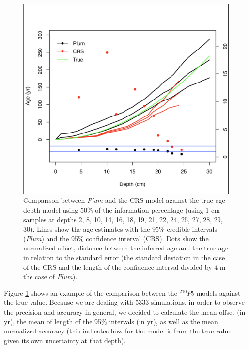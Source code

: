 \documentclass [10pt] {article}
\begin{document}
\begin{figure}[!]
	\begin{centering}
		\includegraphics[width=\linewidth]{comparison1.png}
		\caption{Comparison between \textit{Plum} and the CRS model against the true age-depth model using 50\% of the information percentage (using 1-cm samples at depths 2, 8, 10, 14, 16, 18, 19, 21, 22, 24, 25, 27, 28, 29, 30). Lines show the age estimates with the 95\% credible intervals (\textit{Plum}) and the 95\% confidence interval (CRS). Dots show the normalized offset, distance between the inferred age and the true age in relation to the standard error (the standard deviation in the case of the CRS and the length of the confidence interval divided by 4 in the case of \textit{Plum}).    }
		\label{fig:comparison1r}
	\end{centering}
\end{figure}

Figure \ref{fig:comparison1r} shows an example of the comparison between the $^{210}Pb$ models against the true value. Because we are dealing with 5333 simulations, in order to observe the precision and accuracy in general, we decided to calculate the mean offset (in yr), the mean of length of the 95\% intervals (in yr), as well as the mean normalized accuracy (this indicates how far the model is from the true value given its own uncertainty at that depth).  
\end{document}
